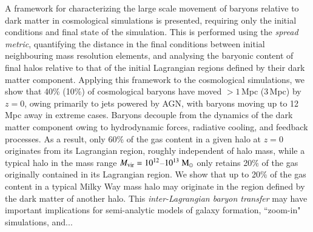 


A framework for characterizing the large scale movement of baryons relative
to dark matter in cosmological simulations is presented, requiring only the
initial conditions and final state of the simulation. This is performed using
the {\it spread metric}, quantifying the distance in the final conditions
between initial neighbouring mass resolution elements, and analysing the
baryonic content of final halos relative to that of the initial Lagrangian
regions defined by their dark matter component. Applying this framework to
the \simba{} cosmological simulations, we show that 40\% (10\%) of
cosmological baryons have moved $> 1$\,Mpc (3\,Mpc) by $z=0$, owing primarily
to jets powered by AGN, with baryons moving up to 12\,Mpc away in extreme
cases. Baryons decouple from the dynamics of the dark matter component owing
to hydrodynamic forces, radiative cooling, and feedback processes. As a
result, only 60\% of the gas content in a given halo at $z=0$ originates from
its Lagrangian region, roughly independent of halo mass, while a typical halo
in the mass range $M_{\rm vir} = 10^{12}$--$10^{13}\;{\rm M}_{\odot}$ only retains 20\%
of the gas originally contained in its Lagrangian region. We show that up to
20\% of the gas content in a typical Milky Way mass halo may originate in the
region defined by the dark matter of another halo. This {\it inter-Lagrangian
baryon transfer} may have important implications for semi-analytic models of
galaxy formation, ``zoom-in" simulations, and...